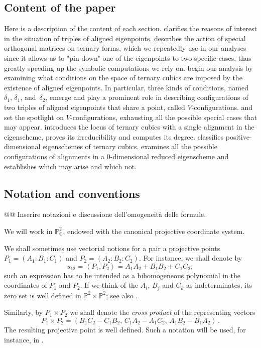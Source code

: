 \documentclass[a4paper, 11pt, reqno]{amsart}
\theoremstyle{plain}
\theoremstyle{definition}
\newcommand{\C}{\mathbb{C}}
\newcommand{\p}{\mathbb{P}}
\newcommand{\scl}[2]{\left\langle {#1}, {#2} \right\rangle}
\begin{document}
\subsection*{Content of the paper}
Here is a description of the content of each section.
 clarifies the reasons of interest in the situation of triples of aligned eigenpoints.
 describes the action of special orthogonal matrices on ternary forms, which we repeatedly use in our analyses since it allows us to "pin down" one of the eigenpoints to two specific cases, thus greatly speeding up the symbolic computations we rely on.
 begin our analysis by examining what conditions on the space of ternary cubics are imposed by the existence of aligned eigenpoints. In particular, three kinds of conditions, named~$\delta_1$, $\bar{\delta}_1$, and~$\delta_2$, emerge and play a prominent role in describing configurations of two triples of aligned eigenpoints that share a point, called $V$-configurations.
 and  set the spotlight on $V$-configurations, exhausting all the possible special cases that may appear.
 introduces the locus of ternary cubics with a single alignment in the eigenscheme, proves its irreducibility and computes its degree.
 classifies positive-dimensional eigenschemes of ternary cubics.
 examines all the possible configurations of alignments in a $0$-dimensional reduced eigenscheme and establishes which may arise and which not.

\subsection{Notation and conventions}
@@ Inserire notazioni e discussione dell'omogeneità delle formule.

We will work in $\p^2_\C$, endowed with the canonical projective coordinate system.

We shall sometimes use vectorial notions for a pair a projective points $P_1=(A_1:B_1:C_1)$ and $P_2=(A_2:B_2:C_2)$. For instance, we shall denote by
%
\[
  s_{12} = \scl{P_1}{P_2} = A_1 A_2 + B_1 B_2 + C_1 C_2;
\]
%
such an expression has to be intended as a bihomogeneous polynomial in the coordinates of $P_1$ and $P_2$. If we think of the $A_i$, $B_j$ and $C_k$ as indeterminates, its zero set is well defined in $\p^2 \times \p^2$; see also .

Similarly, by $P_1 \times P_2$ we shall denote the {\it cross product} of the representing vectors
%
\[
  P_1 \times P_2 = 
  (B_1 C_2 - C_1 B_2, \, C_1 A_2 - A_1 C_2, \, A_1 B_2 - B_1 A_2) \,.
\]
%
The resulting projective point is well defined. Such a notation will be used, for instance, in .
\end{document}
